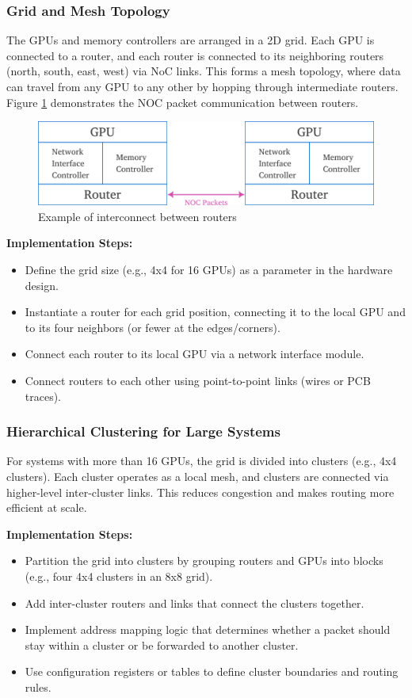 \documentclass[11pt,a4paper]{article}
\begin{document}
\subsubsection{Grid and Mesh Topology}
The GPUs and memory controllers are arranged in a 2D grid. Each GPU is connected to a router, and each router is connected to its neighboring routers (north, south, east, west) via NoC links. This forms a mesh topology, where data can travel from any GPU to any other by hopping through intermediate routers. Figure \ref{fig:router topology} demonstrates the NOC packet communication between routers. 

\begin{figure}[h!]
	\centering
	\includegraphics[width=0.75\linewidth]{images/inter-router-comms.png}
	\caption{Example of interconnect between routers}
	\label{fig:router topology}
\end{figure}

\textbf{Implementation Steps:}
\begin{itemize}
    \item Define the grid size (e.g., 4x4 for 16 GPUs) as a parameter in the hardware design.
    \item Instantiate a router for each grid position, connecting it to the local GPU and to its four neighbors (or fewer at the edges/corners).
    \item Connect each router to its local GPU via a network interface module.
    \item Connect routers to each other using point-to-point links (wires or PCB traces).
\end{itemize}

\subsubsection{Hierarchical Clustering for Large Systems}
For systems with more than 16 GPUs, the grid is divided into clusters (e.g., 4x4 clusters). Each cluster operates as a local mesh, and clusters are connected via higher-level inter-cluster links. This reduces congestion and makes routing more efficient at scale.

\textbf{Implementation Steps:}
\begin{itemize}
    \item Partition the grid into clusters by grouping routers and GPUs into blocks (e.g., four 4x4 clusters in an 8x8 grid).
    \item Add inter-cluster routers and links that connect the clusters together.
    \item Implement address mapping logic that determines whether a packet should stay within a cluster or be forwarded to another cluster.
    \item Use configuration registers or tables to define cluster boundaries and routing rules.
\end{itemize}
\end{document}
